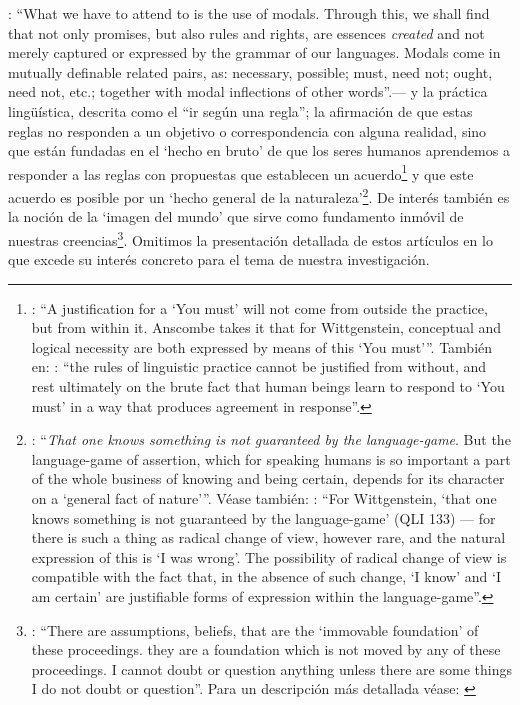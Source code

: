 {\cite[Cf.][100]{anscombe1981erp:rrp}: \enquote{What we have to attend to is the use of modals. Through this, we shall find that not only promises, but also rules and rights, are essences \emph{created} and not merely captured or expressed by the grammar of our languages. Modals come in mutually definable related pairs, as: necessary, possible; must, need not; ought, need not, etc.; together with modal inflections of other words}.}--- y la práctica lingüística, descrita como el ``ir según una regla''; la afirmación de que estas reglas no responden a un objetivo o correspondencia con alguna realidad, sino que están fundadas en el `hecho en bruto' \label{subsec:brutefact} de que los seres humanos aprendemos a responder a las reglas con propuestas que establecen un acuerdo\footnote{\Cite[Cf.][219]{teichmann2008ans}: \enquote{A justification for a `You must' will not come from outside the practice, but from within it. Anscombe takes it that for Wittgenstein, conceptual and logical necessity are both expressed by means of this `You must'}. También en: \Cite[Cf.][220]{teichmann2008ans}: \enquote{the rules of linguistic practice cannot be justified from without, and rest ultimately on the brute fact that human beings learn to respond to `You must' in a way that produces agreement in response}.} y que este acuerdo es posible por un `hecho general de la naturaleza'\footnote{\Cite[Cf.][133]{anscombe1981parmenides:qli}: \enquote{\emph{That one knows something is not guaranteed by the language-game}. \textelp{} But the language-game of assertion, which for speaking humans is so important a part of the whole business of knowing and being certain, depends for its character on a `general fact of nature'}. Véase también: \Cite[Cf.][224]{teichmann2008ans}: \enquote{For Wittgenstein, `that one knows something is not guaranteed by the language-game' (QLI 133) --- for there is such a thing as radical change of view, however rare, and the natural expression of this is `I was wrong'. The possibility of radical change of view is compatible with the fact that, in the absence of such change, `I know' and `I am certain' are justifiable forms of expression within the language-game}.}. De interés también es la noción de la `imagen del mundo' que sirve como fundamento inmóvil de nuestras creencias\footnote{\Cite[130]{anscombe1981parmenides:qli}: \enquote{There are assumptions, beliefs, that are the `immovable foundation' of these proceedings. \textelp{} they are a foundation which is not moved by any of these proceedings. I cannot doubt or question anything unless there are some things I do not doubt or question}. Para un descripción más detallada véase: \Cite[\S95-99]{wittgenstein1969oncertes}}. Omitimos la presentación detallada de estos artículos en lo que excede su interés concreto para el tema de nuestra investigación.

